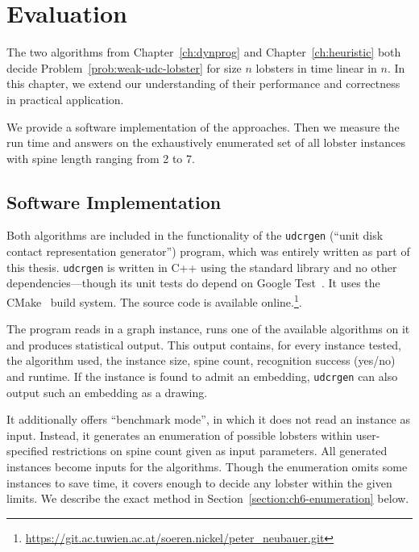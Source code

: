 \chapter{Evaluation}

The two algorithms from Chapter~\ref{ch:dynprog} and Chapter~\ref{ch:heuristic} both decide Problem~\ref{prob:weak-udc-lobster} for size $n$ lobsters in time linear in $n$. In this chapter, we extend our understanding of their performance and correctness in practical application.

We provide a software implementation of the approaches. Then we measure the run time and answers on the exhaustively enumerated set of all lobster instances with spine length ranging from 2 to 7.

\section{Software Implementation}

Both algorithms are included in the functionality of the \texttt{udcrgen} (``unit disk contact representation generator'') program, which was entirely written as part of this thesis. \texttt{udcrgen} is written in C++ using the standard library and no other dependencies---though its unit tests do depend on Google Test~\cite{GoogleTest}. It uses the CMake~\cite{CMake} build system. The source code is available online.\footnote{\url{https://git.ac.tuwien.ac.at/soeren.nickel/peter_neubauer.git}}.

The program reads in a graph instance, runs one of the available algorithms on it and produces statistical output. This output contains, for every instance tested, the algorithm used, the instance size, spine count, recognition success (yes/no) and runtime.  If the instance is found to admit an embedding, \texttt{udcrgen} can also output such an embedding as a drawing.

It additionally offers ``benchmark mode'', in which it does not read an instance as input. Instead, it generates an enumeration of possible lobsters within user-specified restrictions on spine count given as input parameters. All generated instances become inputs for the algorithms. Though the enumeration omits some instances to save time, it covers enough to decide any lobster within the given limits. We describe the exact method in Section~\ref{section:ch6-enumeration} below. 

